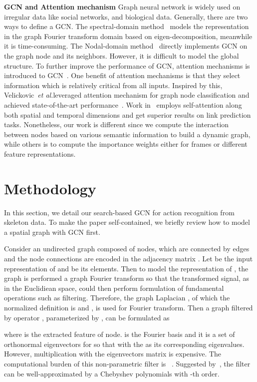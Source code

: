 \documentclass[letterpaper]{article} \usepackage{aaai19}  \usepackage{times}  \usepackage{helvet} \usepackage{courier}  \usepackage[hyphens]{url}  \usepackage{graphicx} \urlstyle{rm} \def\UrlFont{\rm}  \usepackage{graphicx}  \frenchspacing  \setlength{\pdfpagewidth}{8.5in}  \setlength{\pdfpageheight}{11in}
\def\etal{\emph{et al.}}
\begin{document}
\noindent\textbf{GCN and Attention mechanism}  Graph neural network is widely used on irregular data like social networks, and biological data. Generally, there are two ways to define a GCN. The spectral-domain method~\cite{defferrard2016convolutional,kipf2016semi} models the representation in the graph Fourier transform domain based on eigen-decomposition, meanwhile it is time-consuming. The Nodal-domain method~\cite{monti2017geometric,velivckovic2018graph} directly implements GCN on the graph node and its neighbors. However, it is difficult to model the global structure. To further improve the performance of GCN, attention mechanisms is introduced to GCN~\cite{velivckovic2018graph,vaswani2017attention}. One benefit of attention mechanisms is that they select information which is relatively critical from all inputs. Inspired by this, Velickovic~\etal leveraged attention mechanism for graph node classification and achieved state-of-the-art performance~\cite{velivckovic2018graph}. Work in~\cite{sankar2018dynamic} employs self-attention along both spatial and temporal dimensions and get superior results on link prediction tasks. Nonetheless, our work is different since we compute the interaction between nodes based on various semantic information to build a dynamic graph, while others is to compute the importance weights either for frames or different feature representations.




\section{Methodology}
In this section, we detail our search-based GCN for action recognition from skeleton data. To make the paper self-contained, we briefly review how to model a spatial graph with GCN first.

Consider an undirected graph  composed of  nodes, which are connected by  edges and the node connections are encoded in the adjacency matrix . Let  be the input representation of  and be its  elements. Then to model the representation of , the graph is performed a graph Fourier transform so that the transformed signal, as in the Euclidiean space, could then perform formulation of fundamental operations such as filtering. Therefore, the graph Laplacian , of which the normalized definition is  and , is used for Fourier transform. Then a graph filtered by operator , parameterized by , can be formulated as

where  is the extracted feature of node.  is the Fourier basis and it is a set of orthonormal eigenvectors for  so that  with the  as its corresponding eigenvalues. However, multiplication with the eigenvectors matrix is expensive. The computational burden of this non-parametric filter is ~\cite{defferrard2016convolutional}. Suggested by~\cite{hammond2011wavelets}, the filter  can be well-approximated by a Chebyshev polynomials with -th order.
\end{document}
